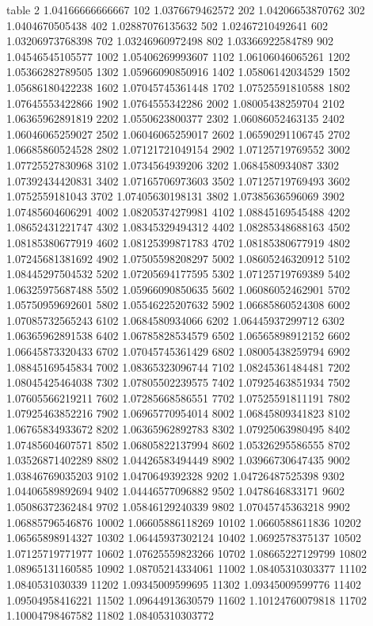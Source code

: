table {%
2 1.04166666666667
102 1.0376679462572
202 1.04206653870762
302 1.0404670505438
402 1.02887076135632
502 1.02467210492641
602 1.03206973768398
702 1.03246960972498
802 1.03366922584789
902 1.04546545105577
1002 1.05406269993607
1102 1.06106046065261
1202 1.05366282789505
1302 1.05966090850916
1402 1.05806142034529
1502 1.05686180422238
1602 1.07045745361448
1702 1.07525591810588
1802 1.07645553422866
1902 1.0764555342286
2002 1.08005438259704
2102 1.06365962891819
2202 1.0550623800377
2302 1.06086052463135
2402 1.06046065259027
2502 1.06046065259017
2602 1.06590291106745
2702 1.06685860524528
2802 1.07121721049154
2902 1.07125719769552
3002 1.07725527830968
3102 1.0734564939206
3202 1.0684580934087
3302 1.07392434420831
3402 1.07165706973603
3502 1.07125719769493
3602 1.0752559181043
3702 1.07405630198131
3802 1.07385636596069
3902 1.07485604606291
4002 1.08205374279981
4102 1.08845169545488
4202 1.08652431221747
4302 1.08345329494312
4402 1.08285348688163
4502 1.08185380677919
4602 1.08125399871783
4702 1.08185380677919
4802 1.07245681381692
4902 1.07505598208297
5002 1.08605246320912
5102 1.08445297504532
5202 1.07205694177595
5302 1.07125719769389
5402 1.06325975687488
5502 1.05966090850635
5602 1.06086052462901
5702 1.05750959692601
5802 1.05546225207632
5902 1.06685860524308
6002 1.07085732565243
6102 1.0684580934066
6202 1.06445937299712
6302 1.06365962891538
6402 1.06785828534579
6502 1.06565898912152
6602 1.06645873320433
6702 1.07045745361429
6802 1.08005438259794
6902 1.08845169545834
7002 1.08365323096744
7102 1.08245361484481
7202 1.08045425464038
7302 1.07805502239575
7402 1.07925463851934
7502 1.07605566219211
7602 1.07285668586551
7702 1.07525591811191
7802 1.07925463852216
7902 1.06965770954014
8002 1.06845809341823
8102 1.06765834933672
8202 1.06365962892783
8302 1.07925063980495
8402 1.07485604607571
8502 1.06805822137994
8602 1.05326295586555
8702 1.03526871402289
8802 1.04426583494449
8902 1.03966730647435
9002 1.03846769035203
9102 1.0470649392328
9202 1.04726487525398
9302 1.04406589892694
9402 1.04446577096882
9502 1.0478646833171
9602 1.05086372362484
9702 1.05846129240339
9802 1.07045745363218
9902 1.06885796546876
10002 1.06605886118269
10102 1.0660588611836
10202 1.06565898914327
10302 1.06445937302124
10402 1.0692578375137
10502 1.07125719771977
10602 1.07625559823266
10702 1.08665227129799
10802 1.08965131160585
10902 1.08705214334061
11002 1.08405310303377
11102 1.0840531030339
11202 1.09345009599695
11302 1.09345009599776
11402 1.09504958416221
11502 1.09644913630579
11602 1.10124760079818
11702 1.10004798467582
11802 1.08405310303772
}
